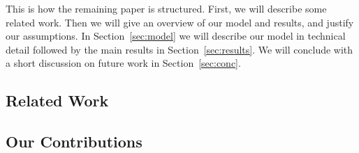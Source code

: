 This is how the remaining paper is structured. First, we will describe some related work. Then we will give an overview of our model and results, and justify our assumptions. 
In Section~\ref{sec:model} we will describe our model in technical detail followed by the main results in Section~\ref{sec:results}. 
We will conclude with a short discussion on future work in Section~\ref{sec:conc}.

\subsection{Related Work}


\subsection{Our Contributions}

